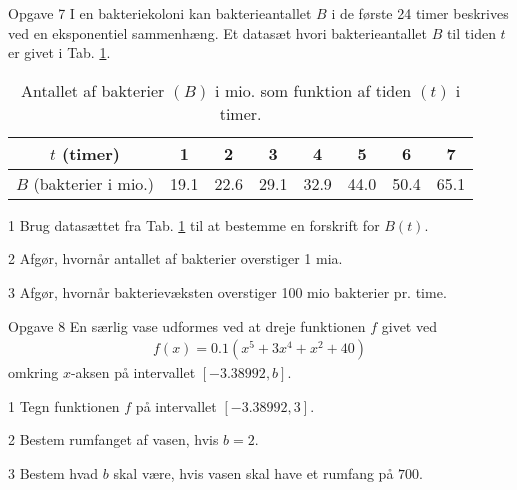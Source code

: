\begin{opgavetekst}{Opgave 7}
	I en bakteriekoloni kan bakterieantallet $B$ i de første 24 timer beskrives ved en eksponentiel sammenhæng. Et datasæt hvori bakterieantallet $B$ til tiden $t$ er givet i 
	Tab. \ref{tab:bakterie}.
	\begin{table}[H]
		\centering
		\begin{tabular}{c|c|c|c|c|c|c|c}
		$t$ (timer) &1 & 2 & 3 & 4 & 5 & 6 & 7 \\
		\hline
		$B$ (bakterier i mio.) & 19.1 & 22.6 & 29.1 & 32.9 & 44.0 & 50.4 & 65.1
		\end{tabular}
		\caption{Antallet af bakterier $(B)$ i mio. som funktion af tiden $(t)$ i timer. }
		\label{tab:bakterie}
	\end{table}\phantom{h}
\end{opgavetekst}
\begin{delopgave}{}{1}
	Brug datasættet fra Tab. \ref{tab:bakterie} til at bestemme en forskrift for $B(t)$.
\end{delopgave}
\begin{delopgave}{}{2}
	Afgør, hvornår antallet af bakterier overstiger 1 mia.
\end{delopgave}
\begin{delopgave}{}{3}
	Afgør, hvornår bakterievæksten overstiger 100 mio bakterier pr. time.  
\end{delopgave}
\begin{opgavetekst}{Opgave 8}
	En særlig vase udformes ved at dreje funktionen $f$ givet ved
	\begin{align*}
		f(x) = 0.1(x^5+3x^4+x^2+40)
	\end{align*}
	omkring $x$-aksen på intervallet $[-3.38992,b]$. 
\end{opgavetekst}
\begin{delopgave}{}{1}
	Tegn funktionen $f$ på intervallet $[-3.38992,3]$.
\end{delopgave}
\begin{delopgave}{}{2}
	Bestem rumfanget af vasen, hvis $b = 2$. 
\end{delopgave}
\begin{delopgave}{}{3}
	Bestem hvad $b$ skal være, hvis vasen skal have et rumfang på $700$.
\end{delopgave}